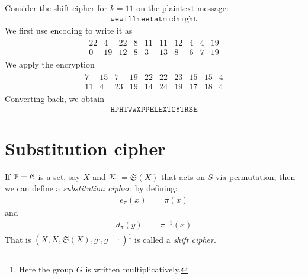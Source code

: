 \documentclass[a4paper, 12pt]{book} %
\begin{document}
\begin{example}
    Consider the shift cipher for $k = 11$ on the plaintext message:
    \begin{align}
        \texttt{wewillmeetatmidnight}
    \end{align}
    We first use encoding to write it as
    \begin{align}
        \begin{array}{cccccccccc}
            22 & 4 & 22 & 8 & 11 & 11 & 12 & 4 & 4 & 19 \\
            0 & 19 & 12 & 8 & 3 & 13 & 8 & 6 & 7 & 19
        \end{array}
    \end{align}
    We apply the encryption
    \begin{align}
        \begin{array}{cccccccccc}
            7 & 15 & 7 & 19 & 22 & 22 & 23 & 15 & 15 & 4 \\
            11 & 4 & 23 & 19 & 14 & 24 & 19 & 17 & 18 & 4
        \end{array}
    \end{align}
    Converting back, we obtain
    \begin{align}
        \texttt{HPHTWWXPPELEXTOYTRSE}
    \end{align}

\end{example}





\section{Substitution cipher}

\begin{definition}
    If $\EuScript{P} = \EuScript{C}$ is a set, say $X$ and $\EuScript{K}$ $= \mathfrak{S}(X)$ that acts on $S$ via permutation, then we can define a \emph{substitution cipher}, by defining:
    \begin{align}
        e_\pi(x) &= \pi(x) 
    \end{align}
    and
    \begin{align}
        d_\pi(y) &= \pi^{-1}(x) 
    \end{align}
    That is $(X, X, \mathfrak{S}(X), g \cdot, g^{-1} \cdot)$\footnote{Here the group $G$ is written multiplicatively.} is called a \emph{shift cipher}.

\end{definition}
\end{document}
